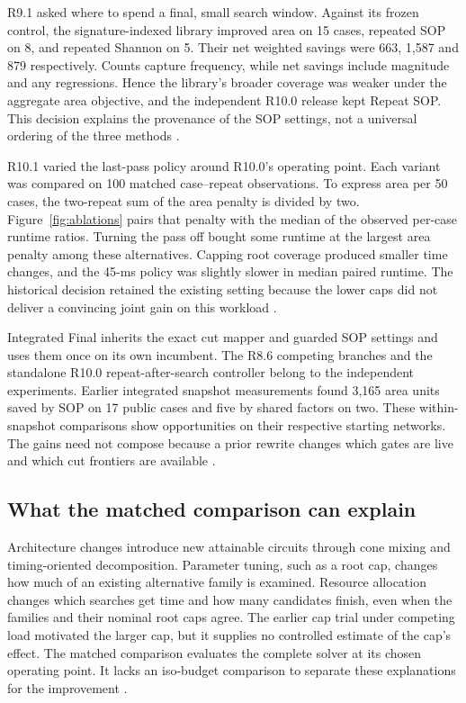 \documentclass[journal,10pt]{IEEEtran}
\begin{document}
R9.1 asked where to spend a final, small search window. Against its frozen control, the signature-indexed library improved area on 15 cases, repeated SOP on 8, and repeated Shannon on 5. Their net weighted savings were 663, 1,587 and 879 respectively. Counts capture frequency, while net savings include magnitude and any regressions. Hence the library's broader coverage was weaker under the aggregate area objective, and the independent R10.0 release kept Repeat SOP. This decision explains the provenance of the SOP settings, not a universal ordering of the three methods \cite{stage2trial}.

R10.1 varied the last-pass policy around R10.0's operating point. Each variant was compared on 100 matched case--repeat observations. To express area per 50 cases, the two-repeat sum of the area penalty is divided by two. Figure~\ref{fig:ablations} pairs that penalty with the median of the observed per-case runtime ratios. Turning the pass off bought some runtime at the largest area penalty among these alternatives. Capping root coverage produced smaller time changes, and the 45-ms policy was slightly slower in median paired runtime. The historical decision retained the existing setting because the lower caps did not deliver a convincing joint gain on this workload \cite{stage2trial}.

Integrated Final inherits the exact cut mapper and guarded SOP settings and uses them once on its own incumbent. The R8.6 competing branches and the standalone R10.0 repeat-after-search controller belong to the independent experiments. Earlier integrated snapshot measurements found 3,165 area units saved by SOP on 17 public cases and five by shared factors on two. These within-snapshot comparisons show opportunities on their respective starting networks. The gains need not compose because a prior rewrite changes which gates are live and which cut frontiers are available \cite{integrationaudit}.

\subsection{What the matched comparison can explain}
Architecture changes introduce new attainable circuits through cone mixing and timing-oriented decomposition. Parameter tuning, such as a root cap, changes how much of an existing alternative family is examined. Resource allocation changes which searches get time and how many candidates finish, even when the families and their nominal root caps agree. The earlier cap trial under competing load motivated the larger cap, but it supplies no controlled estimate of the cap's effect. The matched comparison evaluates the complete solver at its chosen operating point. It lacks an iso-budget comparison to separate these explanations for the improvement \cite{integrationaudit}.
\end{document}
